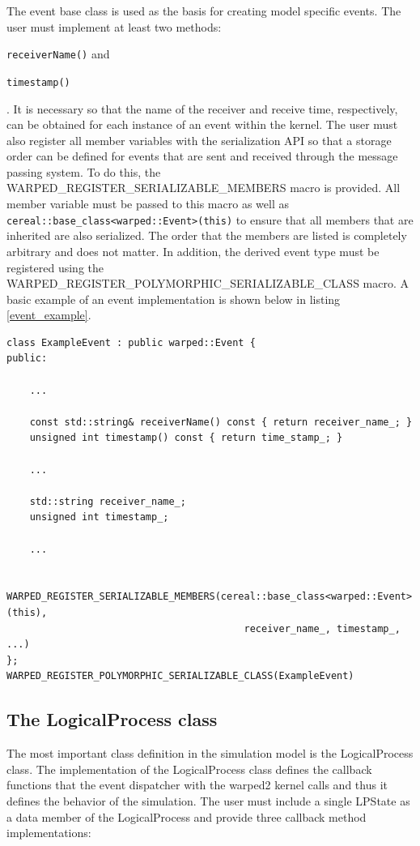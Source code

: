 \documentclass[11pt]{book}
\begin{document}
The event base class is used as the basis for creating model specific events. The user must
implement at least two methods: \begin{inparaenum}[(1)] \item \texttt{receiverName()} and 
\item \texttt{timestamp()} \end{inparaenum}. It is necessary so that the name of the receiver
and receive time, respectively, can be obtained for each instance of an event within the kernel.
The user must also register all member variables with the serialization API so that a storage
order can be defined for events that are sent and received through the message passing system.
To do this, the WARPED\_REGISTER\_SERIALIZABLE\_MEMBERS macro is provided. All member variable
must be passed to this macro as well as \texttt{cereal::base\_class<warped::Event>(this)} to
ensure that all members that are inherited are also serialized. The order that the members are
listed is completely arbitrary and does not matter. In addition, the derived event type must
be registered using the WARPED\_REGISTER\_POLYMORPHIC\_SERIALIZABLE\_CLASS macro. A basic
example of an event implementation is shown below in listing \ref{event_example}.

\begin{lstlisting}[caption=Sample \textsc{warped2} Event Definition, label=event_example, float]
class ExampleEvent : public warped::Event {
public:

    ...

    const std::string& receiverName() const { return receiver_name_; }
    unsigned int timestamp() const { return time_stamp_; }

    ...

    std::string receiver_name_;
    unsigned int timestamp_;

    ...

    WARPED_REGISTER_SERIALIZABLE_MEMBERS(cereal::base_class<warped::Event>(this),
                                         receiver_name_, timestamp_, ...)
};
WARPED_REGISTER_POLYMORPHIC_SERIALIZABLE_CLASS(ExampleEvent)
\end{lstlisting}

\subsection{The LogicalProcess class}

The most important class definition in the simulation model is the LogicalProcess class.
The implementation of the LogicalProcess class defines the callback functions that the
event dispatcher with the warped2 kernel calls and thus it defines the behavior of the simulation.
The user must include a single LPState as a data member of the LogicalProcess and provide three
callback method implementations:
\end{document}
